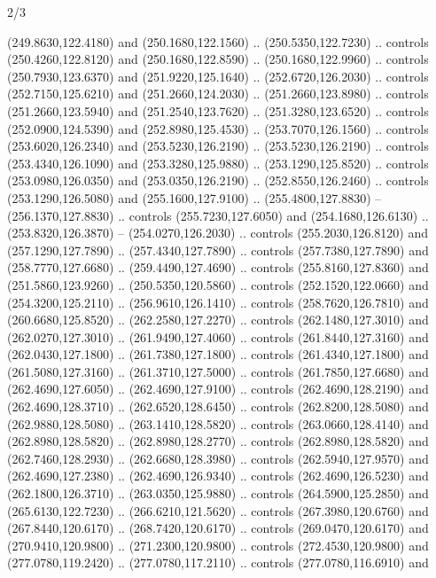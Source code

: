 \begin{flagdescription}{2/3}
\begin{scope}[xshift=0.5\flaglength,yshift=0.5\flagwidth,scale=\flagwidth/259.2]
\begin{scope}[y=0.8pt, x=0.8pt, yscale=-1,shift={(-243,-162)}]
      (249.8630,122.4180) and (250.1680,122.1560) .. (250.5350,122.7230) .. controls
      (250.4260,122.8120) and (250.1680,122.8590) .. (250.1680,122.9960) .. controls
      (250.7930,123.6370) and (251.9220,125.1640) .. (252.6720,126.2030) .. controls
      (252.7150,125.6210) and (251.2660,124.2030) .. (251.2660,123.8980) .. controls
      (251.2660,123.5940) and (251.2540,123.7620) .. (251.3280,123.6520) .. controls
      (252.0900,124.5390) and (252.8980,125.4530) .. (253.7070,126.1560) .. controls
      (253.6020,126.2340) and (253.5230,126.2190) .. (253.5230,126.2190) .. controls
      (253.4340,126.1090) and (253.3280,125.9880) .. (253.1290,125.8520) .. controls
      (253.0980,126.0350) and (253.0350,126.2190) .. (252.8550,126.2460) .. controls
      (253.1290,126.5080) and (255.1600,127.9100) .. (255.4800,127.8830) --
      (256.1370,127.8830) .. controls (255.7230,127.6050) and (254.1680,126.6130) ..
      (253.8320,126.3870) -- (254.0270,126.2030) .. controls (255.2030,126.8120) and
      (257.1290,127.7890) .. (257.4340,127.7890) .. controls (257.7380,127.7890) and
      (258.7770,127.6680) .. (259.4490,127.4690) .. controls (255.8160,127.8360) and
      (251.5860,123.9260) .. (250.5350,120.5860) .. controls (252.1520,122.0660) and
      (254.3200,125.2110) .. (256.9610,126.1410) .. controls (258.7620,126.7810) and
      (260.6680,125.8520) .. (262.2580,127.2270) .. controls (262.1480,127.3010) and
      (262.0270,127.3010) .. (261.9490,127.4060) .. controls (261.8440,127.3160) and
      (262.0430,127.1800) .. (261.7380,127.1800) .. controls (261.4340,127.1800) and
      (261.5080,127.3160) .. (261.3710,127.5000) .. controls (261.7850,127.6680) and
      (262.4690,127.6050) .. (262.4690,127.9100) .. controls (262.4690,128.2190) and
      (262.4690,128.3710) .. (262.6520,128.6450) .. controls (262.8200,128.5080) and
      (262.9880,128.5080) .. (263.1410,128.5820) .. controls (263.0660,128.4140) and
      (262.8980,128.5820) .. (262.8980,128.2770) .. controls (262.8980,128.5820) and
      (262.7460,128.2930) .. (262.6680,128.3980) .. controls (262.5940,127.9570) and
      (262.4690,127.2380) .. (262.4690,126.9340) .. controls (262.4690,126.5230) and
      (262.1800,126.3710) .. (263.0350,125.9880) .. controls (264.5900,125.2850) and
      (265.6130,122.7230) .. (266.6210,121.5620) .. controls (267.3980,120.6760) and
      (267.8440,120.6170) .. (268.7420,120.6170) .. controls (269.0470,120.6170) and
      (270.9410,120.9800) .. (271.2300,120.9800) .. controls (272.4530,120.9800) and
      (277.0780,119.2420) .. (277.0780,117.2110) .. controls (277.0780,116.6910) and

\end{scope}
\end{scope}
\end{flagdescription}
